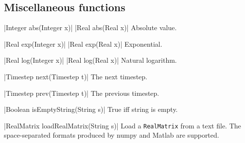 \subsection{Miscellaneous functions}
\label{sec:builtin-misc}

\blog|Integer abs(Integer x)|
\blog|Real abs(Real x)|
\myindent Absolute value.

\blog|Real exp(Integer x)|
\blog|Real exp(Real x)|
\myindent Exponential.

\blog|Real log(Integer x)|
\blog|Real log(Real x)|
\myindent Natural logarithm.

\blog|Timestep next(Timestep t)|
\myindent The next timestep.

\blog|Timestep prev(Timestep t)|
\myindent The previous timestep.

\blog|Boolean isEmptyString(String s)|
\myindent True iff string is empty.

\blog|RealMatrix loadRealMatrix(String s)|
\myindent Load a \verb|RealMatrix| from a text file. The space-separated
formats produced by numpy and Matlab are supported.
